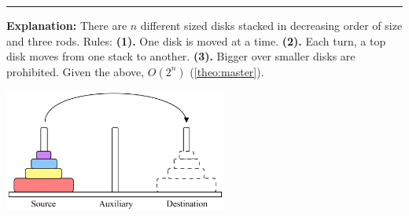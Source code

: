 \begin{Func}

    \label{TowersOfHanoi}
    \vspace{-.5em}
    \begin{algorithm}[H]
        \SetAlgoLined
    \end{algorithm}
    \noindent
    \rule{\textwidth}{0.4pt}
    \textbf{Explanation:} There are $n$ different sized disks stacked in decreasing order of size and three rods. Rules:
    \textbf{(1).} One disk is moved at a time. \textbf{(2).} Each turn, a top disk moves from one stack to another. \textbf{(3).} Bigger over smaller disks are prohibited.
    Given the above, $O(2^n)$ (\ref{theo:master}).
    \begin{center}
        \includegraphics[width=0.55\textwidth]{Sections/hard/hanoi.png}
    \end{center}
    
\end{Func}

\newpage 

